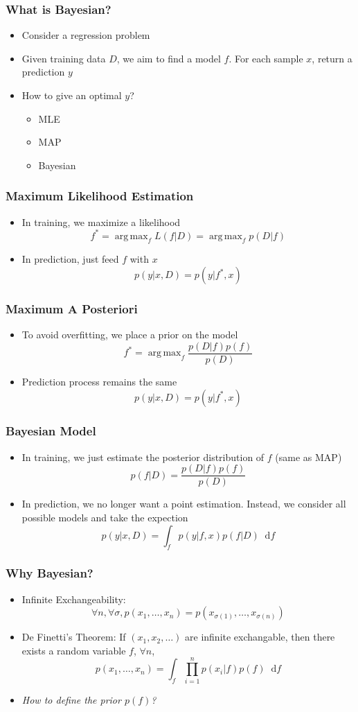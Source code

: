 \documentclass{beamer}
\DeclareMathOperator*{\argmax}{arg\,max}
\newcommand*\diff{\mathop{}\!\mathrm{d}}
\begin{document}
\begin{frame}
	\frametitle{What is Bayesian?}
	\begin{itemize}
		\item Consider a regression problem
		\item Given training data $D$, we aim to find a model $f$. For each sample $x$, return a prediction $y$
		\item How to give an optimal $y$?
		\begin{itemize}
			\pause
			\item MLE
			\item MAP
			\item Bayesian
		\end{itemize}
	\end{itemize}
\end{frame}
\begin{frame}
	\frametitle{Maximum Likelihood Estimation}
	\begin{itemize}
		\item In training, we maximize a likelihood
		\[
			f^* = \argmax_f L(f|D) = \argmax_f p(D|f)
		\]
		\item In prediction, just feed $f$ with $x$
		\[
			p(y|x, D)=p(y|f^*, x)
		\]
	\end{itemize}
\end{frame}
\begin{frame}
	\frametitle{Maximum A Posteriori}
	\begin{itemize}
		\item To avoid overfitting, we place a prior on the model
		\[
			f^* = \argmax_f \frac{p(D|f)p(f)}{p(D)}
		\]
		\item Prediction process remains the same
		\[
			p(y|x, D)=p(y|f^*, x)
		\]
	\end{itemize}
\end{frame}
\begin{frame}
	\frametitle{Bayesian Model}
	\begin{itemize}
		\item In training, we just estimate the posterior distribution of $f$ (same as MAP)
		\[
			p(f|D) = \frac{p(D|f)p(f)}{p(D)}
		\]
		\item In prediction, we no longer want a point estimation. Instead, we consider all possible models and take the expection
		\[
			p(y|x, D)=\int_f p(y|f,x)p(f|D)\diff f
		\]
	\end{itemize}
\end{frame}
\begin{frame}
	\frametitle{Why Bayesian?}
	\begin{itemize}
		\item Infinite Exchangeability:
		\[
		\forall n, \forall \sigma, p(x_1, \ldots, x_n)=p(x_{\sigma(1)},\ldots, x_{\sigma(n)})
		\]
		\item De Finetti’s Theorem: If $(x_1, x_2, \ldots)$ are infinite exchangable, then there exists a random variable $f$, $\forall n$, 
		\[
		p(x_1, \ldots, x_n) = \int_{f} \prod_{i=1}^n p(x_i|f)p(f) \diff f
		\]
		\pause
		\item \em{How to define the prior $p(f)$}?
	\end{itemize}		
\end{frame}
\end{document}
